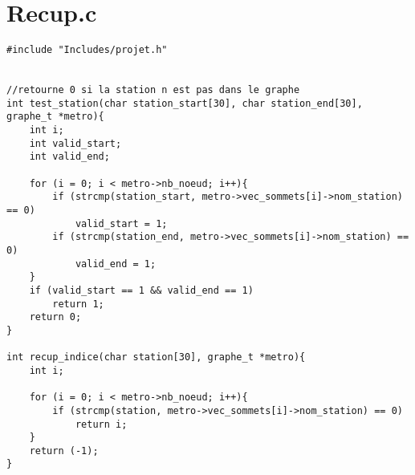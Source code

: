 \documentclass[12pt, twoside]{report}
\begin{document}
\section{Recup.c}
\begin{verbatim}
#include "Includes/projet.h"


//retourne 0 si la station n est pas dans le graphe
int test_station(char station_start[30], char station_end[30], graphe_t *metro){
	int i;
	int valid_start;
	int valid_end;

	for (i = 0; i < metro->nb_noeud; i++){
		if (strcmp(station_start, metro->vec_sommets[i]->nom_station) == 0)
			valid_start = 1;
		if (strcmp(station_end, metro->vec_sommets[i]->nom_station) == 0)
			valid_end = 1;
	}
	if (valid_start == 1 && valid_end == 1)
		return 1;
	return 0;
}

int recup_indice(char station[30], graphe_t *metro){
	int i;

	for (i = 0; i < metro->nb_noeud; i++){
		if (strcmp(station, metro->vec_sommets[i]->nom_station) == 0)
			return i;
	}
	return (-1);
}
\end{verbatim}
\end{document}
